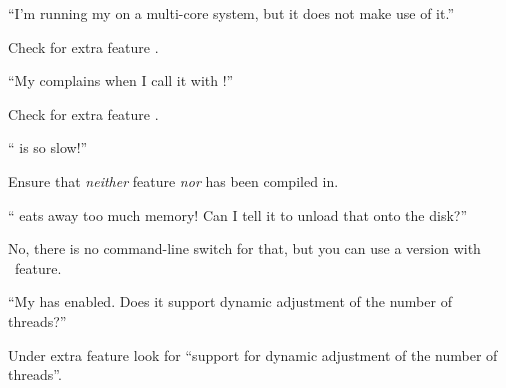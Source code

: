 \begin{qandalist}
\item
  ``I'm running my \appcmd{} on a multi-core system, but it does not make use of it.''
  \begin{qandaanswer}
    Check for extra feature .
  \end{qandaanswer}

\item
  ``My \appcmd{} complains when I call it with !''
  \begin{qandaanswer}
    Check for extra feature .
  \end{qandaanswer}

\item
  ``\appcmd{} is so slow!''
  \begin{qandaanswer}
    Ensure that \emph{neither} feature  \emph{nor}  has been
    compiled in.
  \end{qandaanswer}

  \item
    ``\appcmd{} eats away too much memory!  Can I tell it to unload that onto the disk?''
    \begin{qandaanswer}
      No, there is no command-line switch for that, but you can use a version with
      ~feature.
    \end{qandaanswer}

  \item
    ``My \appcmd{} has  enabled.  Does it support dynamic adjustment of the
    number of threads?''
    \begin{qandaanswer}
      Under extra feature  look for ``support for dynamic adjustment of the
      number of threads''.
    \end{qandaanswer}

\end{qandalist}


